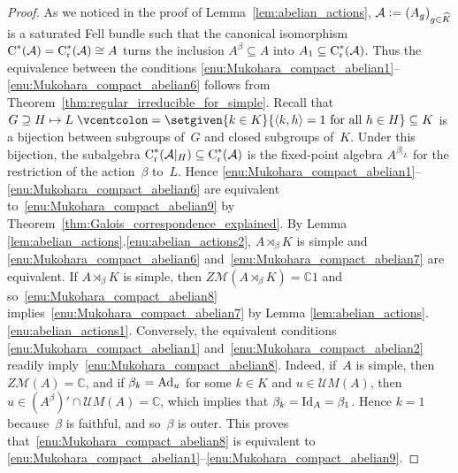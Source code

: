 \documentclass[a4paper]{amsart}
\theoremstyle{plain}
\theoremstyle{definition}
\theoremstyle{remark}
\numberwithin{theorem}{section}
\numberwithin{equation}{section}
\newcommand*{\C}{\mathbb C}
\newcommand*{\red}{\mathrm{r}}%
\newcommand*{\Cst}{\textup C^*}%
\newcommand*{\Mult}{\mathcal M}%
\newcommand*{\UMult}{\mathcal UM}%
\newcommand*{\Id}{\textup{Id}}%
\newcommand*{\Ad}{\textup{Ad}}%
\newcommand*{\A}{\mathcal A}%
\newcommand*{\defeq}{\mathrel{\vcentcolon=}}%
\begin{document}
\begin{proof}
  As we noticed in the proof of Lemma~\ref{lem:abelian_actions},
  \(\A\defeq (A_g)_{g\in \widehat{K}}\) is a saturated Fell
  bundle such that the canonical isomorphism
  \(\Cst(\A)=\Cst_\red(\A)\cong A\) turns the
  inclusion \(A^\beta\subseteq A\)  into \(A_1\subseteq
  \Cst_\red(\A)\).
  Thus the equivalence between the conditions
  \ref{enu:Mukohara_compact_abelian1}--\ref{enu:Mukohara_compact_abelian6}
  follows from Theorem~\ref{thm:regular_irreducible_for_simple}.
  Recall that \(G\supseteq  H \mapsto L\defeq \setgiven{k \in
    K}{\langle k ,h\rangle=1 \text{ for all }h\in H}\subseteq K\) is a
  bijection between subgroups of~\(G\) and closed subgroups of~\(K\).
  Under this bijection, the subalgebra  \(\Cst_\red(\A|_H)\subseteq \Cst_\red(\A)\) is the fixed-point
  algebra  \(A^{\beta|_L}\) for the restriction of the action~\(\beta\) to~\(L\).
  Hence
  \ref{enu:Mukohara_compact_abelian1}--\ref{enu:Mukohara_compact_abelian6}
  are equivalent to~\ref{enu:Mukohara_compact_abelian9} by
  Theorem~\ref{thm:Galois_correspondence_explained}.
  By Lemma \ref{lem:abelian_actions}.\ref{enu:abelian_actions2},
  \(A\rtimes_\beta K\) is simple and
  \ref{enu:Mukohara_compact_abelian6}
  and~\ref{enu:Mukohara_compact_abelian7} are equivalent.
  If \(A\rtimes_\beta K\) is simple, then \(Z\Mult(A\rtimes_\beta
  K)=\C 1\) and so~\ref{enu:Mukohara_compact_abelian8}
  implies~\ref{enu:Mukohara_compact_abelian7} by Lemma
  \ref{lem:abelian_actions}.\ref{enu:abelian_actions1}.
  Conversely, the equivalent conditions
  \ref{enu:Mukohara_compact_abelian1}
  and~\ref{enu:Mukohara_compact_abelian2} readily
  imply~\ref{enu:Mukohara_compact_abelian8}.
  Indeed, if~\(A\) is simple, then \(Z\Mult(A)=\C\), and  if
  \(\beta_k=\Ad_u\) for some \(k\in K\) and \(u \in \UMult(A)\), then
  \(u\in (A^\beta)'\cap \UMult(A)=\C\), which implies that
  \(\beta_k=\Id_A=\beta_1\).
  Hence \(k=1\) because~\(\beta\) is faithful, and so~\(\beta\) is
  outer.
  This proves that~\ref{enu:Mukohara_compact_abelian8} is equivalent
  to
  \ref{enu:Mukohara_compact_abelian1}--\ref{enu:Mukohara_compact_abelian9}.


\end{proof}
\end{document}
